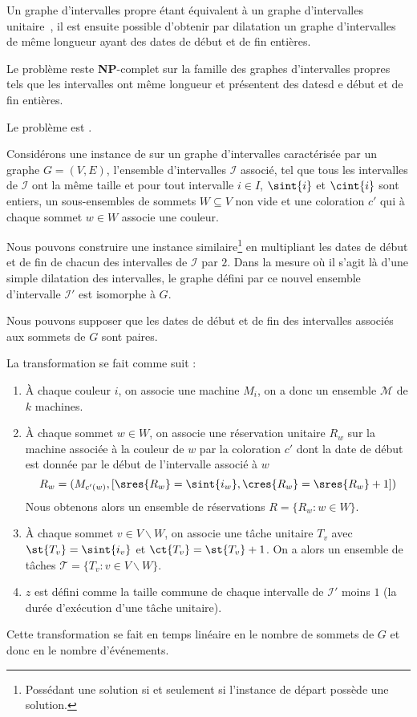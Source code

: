 Un graphe d'intervalles propre étant équivalent à un graphe d'intervalles
unitaire~\cite{bogart1999short}, il est ensuite possible d'obtenir par dilatation un graphe
d'intervalles de même longueur ayant des dates de début et de fin entières.

\begin{ncorol}
    Le problème \precolor{} reste \textbf{NP}-complet sur la famille des graphes d'intervalles
    propres tels que les intervalles ont même longueur et présentent des datesd e début et de fin
    entières.
\end{ncorol}

\begin{nthrm}
    Le problème \unitfischedpi{} est \npc{}.
\end{nthrm}

Considérons une instance de \precolor{} sur un graphe d'intervalles caractérisée par un graphe $G =
(V,E)$, l'ensemble d'intervalles $\mathcal{I}$ associé, tel que tous les intervalles de
$\mathcal{I}$ ont la même taille et pour tout intervalle $i \in I$,
$\sint{i}$ et $\cint{i}$ sont entiers, un sous-ensembles de sommets $W \subseteq
V$ non vide et une coloration $c'$ qui à chaque sommet $w \in W$ associe une couleur. 

Nous pouvons construire une instance similaire\footnote{Possédant une solution si et seulement si
l'instance de départ possède une solution.} en multipliant les dates de début et de fin de chacun
des intervalles de $\mathcal{I}$ par $2$. Dans la mesure où il s'agit là d'une simple dilatation des
intervalles, le graphe défini par ce nouvel ensemble d'intervalle $\mathcal{I}'$ est isomorphe à
$G$.

Nous pouvons supposer que les dates de début et de fin des intervalles associés aux sommets de $G$
sont paires. 

La transformation se fait comme suit :
\begin{enumerate}
    \item À chaque couleur $i$, on associe une machine $M_i$, on a donc un ensemble $\mathcal{M}$ de
        $k$ machines.
    \item À chaque sommet $w \in W$, on associe une réservation unitaire $R_w$ sur la machine associée à
        la couleur de $w$ par la coloration $c'$ dont la date de début est donnée par le
        début de l'intervalle associé à $w$
        \[
            R_w = (M_{c'(w)}, [\sres{R_w} = \sint{i_w}, \cres{R_w} = \sres{R_w} + 1])
        \]
        Nous obtenons alors un ensemble de réservations $R = \{R_w : w \in W\}$.
    \item À chaque sommet $v \in V \backslash W$, on associe une tâche unitaire $T_v$ avec $\st{T_v}
        = \sint{i_v}$ et $\ct{T_v} = \st{T_v} + 1$. On a alors un ensemble de tâches $\mathcal{T} =
        \{T_v : v \in V \backslash W \}$.
    \item $z$ est défini comme la taille commune de chaque intervalle de $\mathcal{I}'$ moins $1$
        (la durée d'exécution d'une tâche unitaire).
\end{enumerate}
Cette transformation se fait en temps linéaire en le nombre de sommets de $G$ et donc en le nombre
d'événements.

